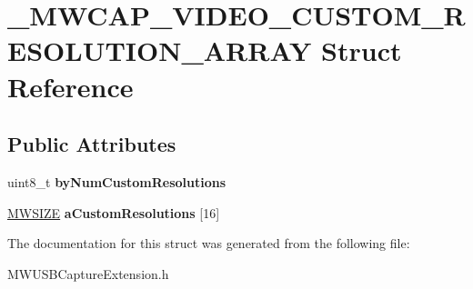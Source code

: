 \hypertarget{struct__MWCAP__VIDEO__CUSTOM__RESOLUTION__ARRAY}{\section{\-\_\-\-M\-W\-C\-A\-P\-\_\-\-V\-I\-D\-E\-O\-\_\-\-C\-U\-S\-T\-O\-M\-\_\-\-R\-E\-S\-O\-L\-U\-T\-I\-O\-N\-\_\-\-A\-R\-R\-A\-Y Struct Reference}
\label{struct__MWCAP__VIDEO__CUSTOM__RESOLUTION__ARRAY}
}
\subsection*{Public Attributes}
\begin{DoxyCompactItemize}
\item 
\hypertarget{struct__MWCAP__VIDEO__CUSTOM__RESOLUTION__ARRAY_aa9eea037e4d711cbdf00e4ae7ba46d1c}{uint8\-\_\-t {\bfseries by\-Num\-Custom\-Resolutions}}\label{struct__MWCAP__VIDEO__CUSTOM__RESOLUTION__ARRAY_aa9eea037e4d711cbdf00e4ae7ba46d1c}

\item 
\hypertarget{struct__MWCAP__VIDEO__CUSTOM__RESOLUTION__ARRAY_ac0a553b885deac646a893e609e029e81}{\hyperlink{struct__MWSIZE}{M\-W\-S\-I\-Z\-E} {\bfseries a\-Custom\-Resolutions} \mbox{[}16\mbox{]}}\label{struct__MWCAP__VIDEO__CUSTOM__RESOLUTION__ARRAY_ac0a553b885deac646a893e609e029e81}

\end{DoxyCompactItemize}


The documentation for this struct was generated from the following file\-:\begin{DoxyCompactItemize}
\item 
M\-W\-U\-S\-B\-Capture\-Extension.\-h\end{DoxyCompactItemize}
